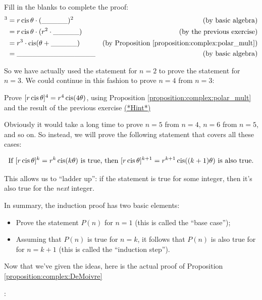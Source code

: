 {\begin{exercise}{28} Fill in the blanks to complete the proof:
\begin{align*}
[r\cis\theta]^{3} &= r\cis\theta \cdot (\_\_\_\_\_)^{2} & \mbox{(by basic algebra)} \\
 &=  r\cis\theta \cdot (r^{2} \cdot \_\_\_\_\_) & \mbox{(by the previous exercise)}\\
 &=  r^{3} \cdot \cis( \theta +  \_\_\_\_\_) & \mbox{(by Proposition \ref{proposition:complex:polar_mult})}\\
 &=   \_\_\_\_\_\_\_\_\_\_\_\_\_\_\_ & \mbox{(by basic algebra)}\\
\end{align*}
\end{exercise}

\noindent So we have actually used the statement for $n=2$ to prove the statement for $n=3$. We could continue in this fashion to prove $n=4$ from $n=3$:

\begin{exercise}{29} Prove $[r\operatorname{cis}\theta]^{4}=r^{4}\operatorname{cis}(4\theta)$, using Proposition
\ref{proposition:complex:polar_mult} and the result of the previous exercise 
\hyperref[sec:complex:hints]{(*Hint*)}
\end{exercise}

 \noindent Obviously it would take a long time to prove $n=5$ from $n=4$, $n=6$ from $n=5$, and so on. So instead, we will prove the following statement that covers all these cases:

\[ \mbox{If } [r\operatorname{cis}\theta]^{k}=r^{k}\operatorname{cis}(k\theta) \mbox{ is true, then } [r\operatorname{cis}\theta]^{k+1}=r^{k+1}\operatorname{cis}((k+1)\theta) \mbox{ is also true.} \]

This allows us to ``ladder up'': if the statement is true for some integer, then it's also true for the {\it next} integer.

In summary, the induction proof has two basic elements:
\begin{itemize}
\item
Prove the statement $P(n)$ for $n=1$ (this is called the ``base case'');
\item
Assuming that $P(n)$  is true for $n=k$, it follows that $P(n)$  is also true for for $n=k+1$ (this is called the ``induction step'').
\end{itemize}

\noindent Now that we've given the ideas, here is the actual proof  of Proposition \ref{proposition:complex:DeMoivre}}:
\medskip{}
\newline
